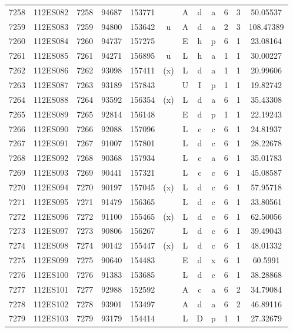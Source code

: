 \begin{tabular}{|*{12}{c|}}
7258 & 112ES082 & 7258 & 94687 & 153771 &  & A & d & a & 6 & 3 & 50.05537 \\ 
7259 & 112ES083 & 7259 & 94800 & 153642 & u & A & d & a & 2 & 3 & 108.47389 \\ 
7260 & 112ES084 & 7260 & 94737 & 157275 &  & E & h & p & 6 & 1 & 23.08164 \\ 
7261 & 112ES085 & 7261 & 94271 & 156895 & u & L & h & a & 1 & 1 & 30.00227 \\ 
7262 & 112ES086 & 7262 & 93098 & 157411 & (x) & L & d & a & 1 & 1 & 20.99606 \\ 
7263 & 112ES087 & 7263 & 93189 & 157843 &  & U & I & p & 1 & 1 & 19.82742 \\ 
7264 & 112ES088 & 7264 & 93592 & 156354 & (x) & L & d & a & 6 & 1 & 35.43308 \\ 
7265 & 112ES089 & 7265 & 92814 & 156148 &  & E & d & p & 1 & 1 & 22.19243 \\ 
7266 & 112ES090 & 7266 & 92088 & 157096 &  & L & c & c & 6 & 1 & 24.81937 \\ 
7267 & 112ES091 & 7267 & 91007 & 157801 &  & L & d & c & 6 & 1 & 28.22678 \\ 
7268 & 112ES092 & 7268 & 90368 & 157934 &  & L & c & a & 6 & 1 & 35.01783 \\ 
7269 & 112ES093 & 7269 & 90441 & 157321 &  & L & c & c & 6 & 1 & 45.08587 \\ 
7270 & 112ES094 & 7270 & 90197 & 157045 & (x) & L & d & c & 6 & 1 & 57.95718 \\ 
7271 & 112ES095 & 7271 & 91479 & 156365 &  & L & d & c & 6 & 1 & 33.80561 \\ 
7272 & 112ES096 & 7272 & 91100 & 155465 & (x) & L & d & c & 6 & 1 & 62.50056 \\ 
7273 & 112ES097 & 7273 & 90806 & 156267 &  & L & d & c & 6 & 1 & 39.49043 \\ 
7274 & 112ES098 & 7274 & 90142 & 155447 & (x) & L & d & c & 6 & 1 & 48.01332 \\ 
7275 & 112ES099 & 7275 & 90640 & 154483 &  & E & d & x & 6 & 1 & 60.5991 \\ 
7276 & 112ES100 & 7276 & 91383 & 153685 &  & L & d & c & 6 & 1 & 38.28868 \\ 
7277 & 112ES101 & 7277 & 92988 & 152592 &  & A & c & a & 6 & 2 & 34.79084 \\ 
7278 & 112ES102 & 7278 & 93901 & 153497 &  & A & d & a & 6 & 2 & 46.89116 \\ 
7279 & 112ES103 & 7279 & 93179 & 154414 &  & L & D & p & 1 & 1 & 27.32679 \\ 

\end{tabular}
